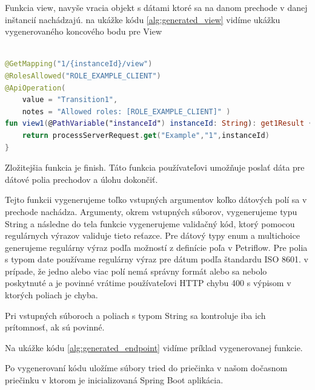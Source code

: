 Funkcia view, navyše vracia objekt s dátami ktoré sa na danom prechode v danej inštancií nachádzajú. na ukážke kódu \ref{alg:generated_view} vidíme ukážku vygenerovaného koncového bodu pre View

\begin{lstlisting}[float, caption={Príklad vygenerovanej funkcie},label={alg:generated_view},language=Kotlin]

@GetMapping("1/{instanceId}/view")
@RolesAllowed("ROLE_EXAMPLE_CLIENT")
@ApiOperation(
	value = "Transition1",
	notes = "Allowed roles: [ROLE_EXAMPLE_CLIENT]" )
fun view1(@PathVariable("instanceId") instanceId: String): get1Result {
	return processServerRequest.get("Example","1",instanceId)
}
\end{lstlisting}


Zložitejšia funkcia je finish. Táto funkcia používateľovi umožňuje poslať dáta pre dátové polia prechodov a úlohu dokončiť.

Tejto funkcii vygenerujeme toľko vstupných argumentov koľko dátových polí sa v prechode nachádza. Argumenty, okrem vstupných súborov, vygenerujeme typu String a následne do tela funkcie vygenerujeme validačný kód, ktorý pomocou regulárnych výrazov validuje tieto reťazce. Pre dátový typy enum a multichoice generujeme regulárny výraz podľa možností z definície poľa v Petriflow. Pre polia s typom date používame regulárny výraz pre dátum podľa štandardu ISO 8601. v prípade, že jedno alebo viac polí nemá správny formát alebo sa nebolo poskytnuté a je povinné vrátime používateľovi HTTP chybu 400 s výpisom v ktorých poliach je chyba.

Pri vstupných súboroch a poliach s typom String sa kontroluje iba ich prítomnosť, ak sú povinné.

Na ukážke kódu \ref{alg:generated_endpoint} vidíme príklad vygenerovanej funkcie.

Po vygenerovaní kódu uložíme súbory tried do priečinka v našom dočasnom priečinku v ktorom je inicializovaná Spring Boot aplikácia.

